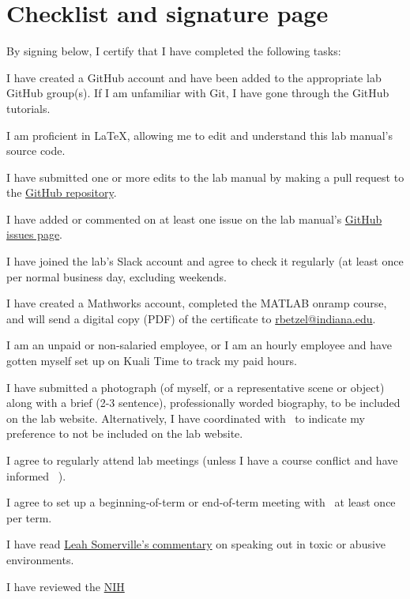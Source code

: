 \documentclass{tufte-book} %
\begin{document}
 \chapter{Checklist and signature page}
 By signing below, I certify that I have completed the following tasks:
\begin{todolist}
 \item I have created a GitHub account and have been added to the appropriate lab
 GitHub group(s). If I am unfamiliar with Git, I have gone through the GitHub tutorials.
 \item I am proficient in \LaTeX, allowing me to edit and understand this lab manual's source code.
 \item I have submitted one or more edits to the lab manual by making a pull request to the \href{https://github.com/brain-networks}{GitHub repository}.
 \item I have added or commented on at least one issue on the lab manual's \href{https://github.com/brain-networks/lab-manual/issues}{GitHub issues page}.
 \item I have joined the lab's Slack account and agree to check it regularly (at least once per normal business day, excluding weekends.
 \item I have created a Mathworks account, completed the MATLAB onramp course, and will send a digital copy (PDF) of the certificate to \href{mailto:rbetzel@indiana.edu}{rbetzel@indiana.edu}. 
 \item I am an unpaid or non-salaried employee, or I am an hourly employee and have gotten myself set up on Kuali Time to track my paid hours.
 \item I have submitted a photograph (of myself, or a representative scene or object) along with a brief (2-3 sentence), professionally worded biography, to be included on the lab website. Alternatively, I have coordinated with \director~to indicate my preference to not be included on the lab website.
 \item I agree to regularly attend lab meetings (unless I have a course conflict and have informed \director~).
 \item I agree to set up a beginning-of-term or end-of-term meeting with \director~at least once per term.
 \item I have read \href{https://www.sciencemag.org/careers/2018/11/what-can-we-learn-Indiana University}{Leah Somerville's commentary} on speaking out in toxic or abusive environments.
 \item I have reviewed the \href{https://oir.nih.gov/sites/default/files/uploads/sourcebook/documents/ethical_conduct/guidelines-authorship_contributions.pdf}{NIH
}
\end{todolist}
\end{document}
